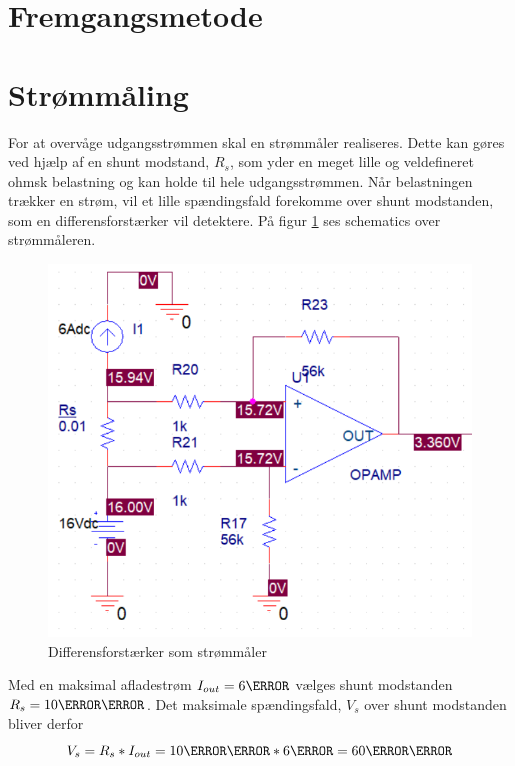 \section{Fremgangsmetode}

\section{Strømmåling}
For at overvåge udgangsstrømmen skal en strømmåler realiseres. Dette kan gøres ved hjælp af en shunt modstand, $R_{s}$, som yder en meget lille og veldefineret ohmsk belastning og kan holde til hele udgangsstrømmen. Når belastningen trækker en strøm, vil et lille spændingsfald forekomme over shunt modstanden, som en differensforstærker vil detektere. På figur \ref{fig:current_sense} ses schematics over strømmåleren.

\begin{figure}[h]
	\centering
	\includegraphics[width=15cm]{billeder/current_sense.png}
	\caption{Differensforstærker som strømmåler}
	\label{fig:current_sense}
\end{figure}

Med en maksimal afladestrøm $I_{out} = 6\ampere$ vælges shunt modstanden $R_{s} = 10\milli\ohm$. Det maksimale spændingsfald, $V_{s}$ over shunt modstanden bliver derfor
\begin {equation} 
V_{s} = R_{s} * I_{out} = 10\milli\ohm * 6\ampere = 60\milli\volt
\end {equation}

